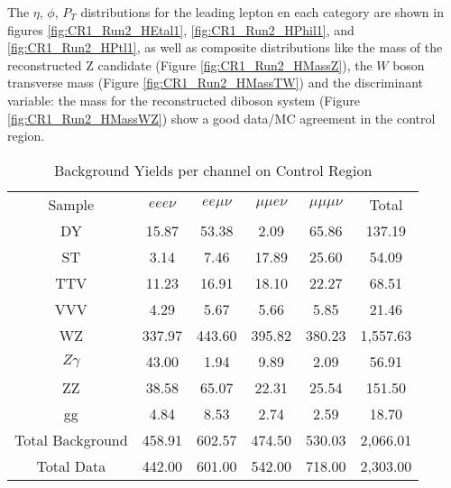 The $\eta$, $\phi$, $P_{T}$ distributions for the leading lepton en each category
are shown in figures \ref{fig:CR1_Run2_HEtal1}, \ref{fig:CR1_Run2_HPhil1}, and
\ref{fig:CR1_Run2_HPtl1}, as well as composite distributions like the mass of the
reconstructed Z candidate (Figure \ref{fig:CR1_Run2_HMassZ}), the $W$ boson transverse mass
(Figure \ref{fig:CR1_Run2_HMassTW}) and the discriminant variable: the mass for the
reconstructed diboson system (Figure \ref{fig:CR1_Run2_HMassWZ}) show a good data/MC
agreement in the control region.


\begin{table}
  \caption{Background Yields per
    channel on Control Region}
 \begin{center}
 \begin{tabular}{cccccc}\hline\hline
Sample & $eee\nu$ & $ee\mu\nu$ & $\mu\mu e\nu$ & $\mu\mu\mu\nu$ & Total \\
DY & 15.87 & 53.38 & 2.09 & 65.86 & 137.19 \\
ST & 3.14 & 7.46 & 17.89 & 25.60 & 54.09 \\
TTV & 11.23 & 16.91 & 18.10 & 22.27 & 68.51 \\
VVV & 4.29 & 5.67 & 5.66 & 5.85 & 21.46 \\
WZ & 337.97 & 443.60 & 395.82 & 380.23 & 1,557.63 \\
$Z\gamma$ & 43.00 & 1.94 & 9.89 & 2.09 & 56.91 \\
ZZ & 38.58 & 65.07 & 22.31 & 25.54 & 151.50 \\
gg & 4.84 & 8.53 & 2.74 & 2.59 & 18.70 \\ \hline
Total Background & 458.91 & 602.57 & 474.50 & 530.03 & 2,066.01 \\ \hline
Total Data & 442.00 & 601.00 & 542.00 & 718.00 & 2,303.00 \\ \hline
 \end{tabular}
 \end{center}
 \label{tab:BackgroundYieldsCR}
\end{table}


